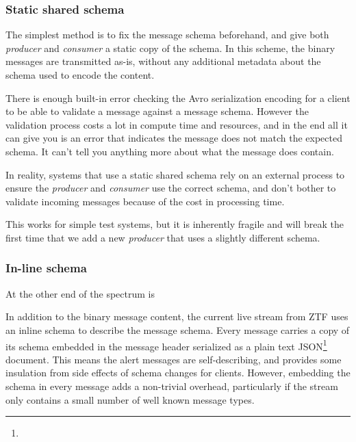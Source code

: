 \documentclass{article}
\newcommand{\json} {JSON\xspace}
\newcommand{\avro} {Avro\xspace}
\newcommand{\kfconsumer} {\textit{consumer}\xspace}
\newcommand{\kfproducer} {\textit{producer}\xspace}
\newcommand{\ztf} {ZTF\xspace}
\newcommand{\footurl}[1] {\footnote{\burl{#1}}}
\begin{document}
\subsubsection{Static shared schema}
\label{avro-static-schema}

The simplest method is to fix the message schema beforehand, and give both \kfproducer and \kfconsumer a static copy of the schema.  In this scheme, the binary messages are transmitted as-is, without any additional metadata about the schema used to encode the content.

There is enough built-in error checking the \avro serialization encoding for a client to be able to validate a message against a message schema. However the validation process costs a lot in compute time and resources, and in the end all it can give you is an error that indicates the message does not match the expected schema. It can't tell you anything more about what the message does contain.

In reality, systems that use a static shared schema rely on an external process to ensure the \kfproducer and \kfconsumer use the correct schema, and don't bother to validate incoming messages because of the cost in processing time.

This works for simple test systems, but it is inherently fragile and will break the first time that we add a new  \kfproducer that uses a slightly different schema.


\subsubsection{In-line schema}
\label{avro-inline-schema}

At the other end of the spectrum is 









In addition to the binary message content, the current live stream from \ztf uses an inline schema to describe the message schema. Every message carries a copy of its schema embedded in the message header serialized as a plain text \json\footurl{https://www.json.org/} document.
This means the alert messages are self-describing, and provides some insulation from side effects of schema changes for clients.
However, embedding the schema in every message adds a non-trivial overhead, particularly if the stream only contains a small number of well known message types.
\end{document}
